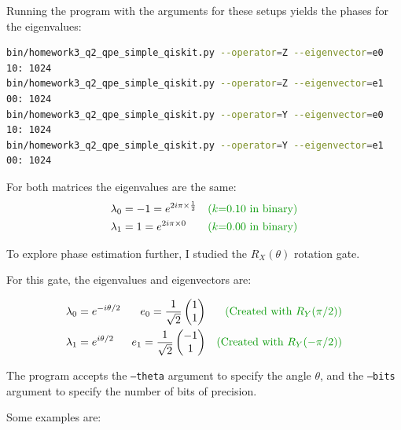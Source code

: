 \documentclass[12pt]{extarticle}
\begin{document}
Running the program with the arguments for these setups yields the phases for the eigenvalues:

\begin{lstlisting}[language=bash]
bin/homework3_q2_qpe_simple_qiskit.py --operator=Z --eigenvector=e0
10: 1024
bin/homework3_q2_qpe_simple_qiskit.py --operator=Z --eigenvector=e1
00: 1024
bin/homework3_q2_qpe_simple_qiskit.py --operator=Y --eigenvector=e0
10: 1024
bin/homework3_q2_qpe_simple_qiskit.py --operator=Y --eigenvector=e1
00: 1024
\end{lstlisting}

For both matrices the eigenvalues are the same:
\begin{align*}
\lambda_0 &= -1 = e^{2i\pi\times \frac{1}{2}} && \expl{$k$=0.10 in binary}\\
\lambda_1 &= 1 = e^{2i\pi\times 0} && \expl{$k$=0.00 in binary}\\
\end{align*}

To explore phase estimation further, I studied the $R_X(\theta)$ rotation gate.

For this gate, the eigenvalues and eigenvectors are:

\begin{align*}
\lambda_0 &= e^{-i\theta/2} & e_0 = \frac{1}{\sqrt{2}}\begin{pmatrix} 1 \\ 1 \end{pmatrix} && \expl{Created with $R_Y(\pi/2)$}\\
\lambda_1 &= e^{i\theta/2} & e_1 = \frac{1}{\sqrt{2}}\begin{pmatrix} -1 \\ 1 \end{pmatrix} && \expl{Created with $R_Y(-\pi/2)$}\\
\end{align*}

The program accepts the \texttt{---theta} argument to specify the angle $\theta$, and the \texttt{---bits} argument to specify the number of bits of precision.

Some examples are:
\end{document}
